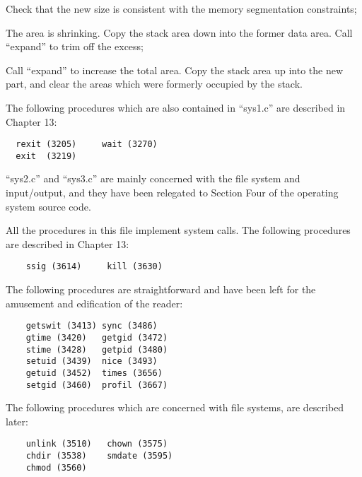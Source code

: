 \item[3371:] Check that the new size is consistent with the memory
segmentation constraints;

\item[3376:] The area is shrinking. Copy the
 stack area down into the former
 data area. Call ``expand'' to trim
 off the excess;

\item[3386:] Call ``expand'' to increase the
 total area. Copy the stack area
 up into the new part, and clear
the areas which were formerly
occupied by the stack.
\ed

The following procedures which are also
contained in ``sys1.c'' are described in
Chapter 13:

\begin{verbatim}
  rexit (3205)     wait (3270)
  exit  (3219)
\end{verbatim}


``sys2.c'' and ``sys3.c'' are mainly concerned with the file system and
input/output, and they have been
relegated to Section Four of the
operating system source code.



All the procedures in this file implement system calls.
The following procedures are described in Chapter 13:

\begin{verbatim}
    ssig (3614)     kill (3630)
\end{verbatim}

The following procedures are straightforward and have been left for the
amusement and edification of the reader:

\begin{verbatim}
    getswit (3413) sync (3486)
    gtime (3420)   getgid (3472)
    stime (3428)   getpid (3480)
    setuid (3439)  nice (3493)
    getuid (3452)  times (3656)
    setgid (3460)  profil (3667)
\end{verbatim}

The following procedures which are concerned with file systems, are described
later:

\begin{verbatim}
    unlink (3510)   chown (3575)
    chdir (3538)    smdate (3595)
    chmod (3560)
\end{verbatim}
